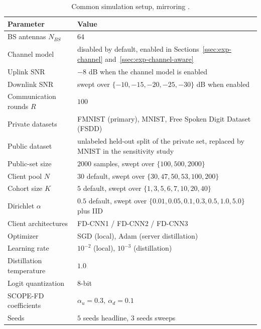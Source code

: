 \documentclass[journal]{IEEEtran}
\newcommand{\rev}[1]{#1}
\begin{document}
\begin{table}[t]
\centering
\caption{Common simulation setup, mirroring \cite{mu2024fedtskd}.}
\label{tab:setup}
\renewcommand{\arraystretch}{1.05}
\footnotesize
\setlength{\tabcolsep}{4pt}
\begin{tabular}{@{}>{\raggedright\arraybackslash}m{}>{\raggedright\arraybackslash}m{}@{}}
\toprule
\textbf{Parameter} & \textbf{Value} \\
\midrule
BS antennas $N_{BS}$ & $64$ \\
\rev{Channel model} & \rev{disabled by default, enabled in Sections~\ref{ssec:exp-channel} and~\ref{ssec:exp-channel-aware}} \\
\rev{Uplink SNR} & \rev{$-8$ dB when the channel model is enabled} \\
\rev{Downlink SNR} & \rev{swept over $\{-10,-15,-20,-25,-30\}$ dB when enabled} \\
Communication rounds $R$ & $100$ \\
Private datasets & \rev{FMNIST (primary), MNIST, Free Spoken Digit Dataset (FSDD)} \\
Public dataset & \rev{unlabeled held-out split of the private set, replaced by MNIST in the sensitivity study} \\
\rev{Public-set size} & \rev{$2000$ samples, swept over $\{100, 500, 2000\}$} \\
\rev{Client pool $N$} & \rev{$30$ default, swept over $\{30,47,50,53,100,200\}$} \\
\rev{Cohort size $K$} & \rev{$5$ default, swept over $\{1,3,5,6,7,10,20,40\}$} \\
Dirichlet $\alpha$ & \rev{$0.5$ default, swept over $\{0.01,0.05,0.1,0.3,0.5,1.0,5.0\}$ plus IID} \\
Client architectures & FD-CNN1 / FD-CNN2 / FD-CNN3 \\
Optimizer & SGD (local), Adam (server distillation) \\
Learning rate & $10^{-2}$ (local), $10^{-3}$ (distillation) \\
Distillation temperature & $1.0$ \\
Logit quantization & $8$-bit \\
SCOPE-FD coefficients & $\alpha_u = 0.3,\ \alpha_d = 0.1$ \\
\rev{Seeds} & \rev{$5$ seeds headline, $3$ seeds sweeps} \\
\bottomrule
\end{tabular}
\end{table}
\end{document}

